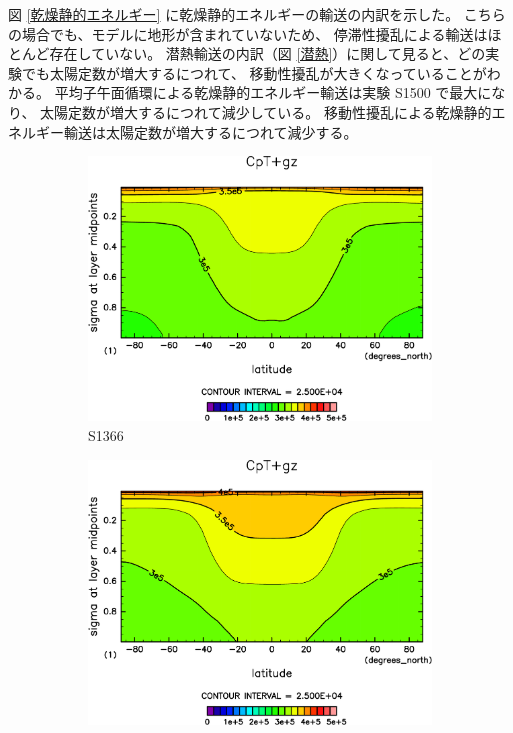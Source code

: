 \documentclass[body]{subfiles}
\begin{document}
図 \ref{乾燥静的エネルギー} に乾燥静的エネルギーの輸送の内訳を示した。
こちらの場合でも、モデルに地形が含まれていないため、
停滞性擾乱による輸送はほとんど存在していない。
潜熱輸送の内訳（図 \ref{潜熱}）に関して見ると、どの実験でも太陽定数が増大するにつれて、
移動性擾乱が大きくなっていることがわかる。
平均子午面循環による乾燥静的エネルギー輸送は実験 S1500 で最大になり、
太陽定数が増大するにつれて減少している。
移動性擾乱による乾燥静的エネルギー輸送は太陽定数が増大するにつれて減少する。

\begin{figure}[t]
	\centering
	\begin{subfigure}{.4\textwidth}
		\centering
		\includegraphics[width=\columnwidth]{S1366/CpT+gz,time=14600:14965-crop-rotate.pdf}
		\caption{S1366}\label{CpT+gzS1366}
	\end{subfigure}
	\begin{subfigure}{.4\textwidth}
		\centering
		\includegraphics[width=\columnwidth]{S1500/CpT+gz,time=3650:4015-crop-rotate.pdf}

\end{subfigure}
\end{figure}
\end{document}
